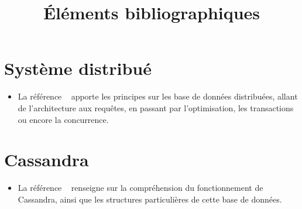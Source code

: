 \documentclass[12 pt]{article}
\title{Éléments bibliographiques}
\begin{document}
\maketitle
\section{Système distribué}

\begin{itemize}
\item La référence ~\cite{RefOzsu2011} apporte les principes sur les base de données distribuées, allant de l'architecture aux requêtes, en passant par l'optimisation, les transactions ou encore la concurrence.
\end{itemize}


\section{Cassandra}

\begin{itemize}
\item La référence ~\cite{RefHewitt2010} renseigne sur la compréhension du fonctionnement de Cassandra, ainsi que les structures particulières de cette base de données.
\end{itemize}



\end{document}
